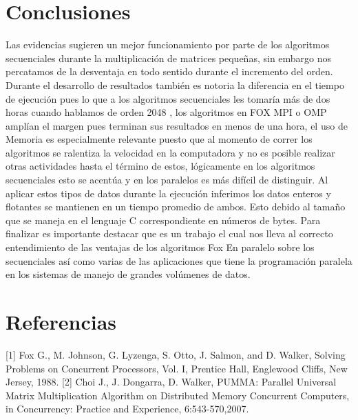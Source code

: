 \documentclass[10pt]{IEEEtran}
\begin{document}
\section{Conclusiones}
Las evidencias sugieren un mejor funcionamiento por parte de los algoritmos secuenciales durante la multiplicación de matrices pequeñas, sin embargo nos percatamos de la desventaja en todo sentido durante el incremento del orden. Durante el desarrollo de resultados también es notoria la diferencia en el tiempo de ejecución pues lo que a los algoritmos secuenciales les tomaría más de dos horas cuando hablamos de orden 2048 , los algoritmos en FOX MPI o OMP amplían el margen pues terminan sus resultados en menos de una hora, el uso de Memoria es especialmente relevante puesto que al momento de correr los algoritmos se ralentiza la velocidad en la computadora y no es posible realizar otras actividades hasta el término de estos, lógicamente en los algoritmos secuenciales esto se acentúa y en los paralelos es más difícil de distinguir. Al aplicar estos tipos de datos durante la ejecución inferimos los datos enteros y flotantes se mantienen en un tiempo promedio  de ambos. Esto debido al tamaño que se maneja en el lenguaje C correspondiente en números de bytes. Para finalizar es importante destacar que es un trabajo el cual nos lleva al correcto entendimiento de las ventajas de los algoritmos Fox En paralelo sobre los secuenciales así como varias de las aplicaciones que tiene la programación paralela en los sistemas de manejo de grandes volúmenes de datos.

\section{Referencias}
{[1]} Fox G., M. Johnson, G. Lyzenga, S. Otto, J. Salmon, and D. Walker, Solving Problems on Concurrent Processors, Vol. I, Prentice Hall, Englewood Cliffs, New Jersey, 1988.
{[2]} Choi J., J. Dongarra, D. Walker, PUMMA: Parallel Universal Matrix Multiplication Algorithm on Distributed Memory Concurrent Computers, in Concurrency: Practice and Experience, 6:543-570,2007.
\end{document}
